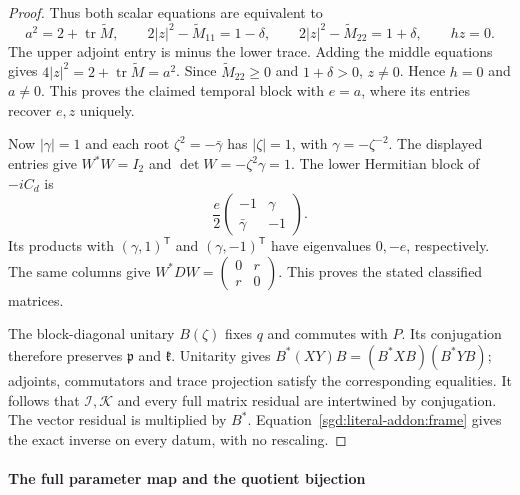 \begin{proof}
Thus both scalar equations are equivalent to
\[
 a^2=2+\operatorname{tr}\widetilde M,\qquad
 2|z|^2-\widetilde M_{11}=1-\delta,\qquad
 2|z|^2-\widetilde M_{22}=1+\delta,\qquad hz=0.
\]
The upper adjoint entry is minus the lower trace.
Adding the middle equations gives
$4|z|^2=2+\operatorname{tr}\widetilde M=a^2$.
Since $\widetilde M_{22}\ge0$ and $1+\delta>0$, $z\ne0$.
Hence $h=0$ and $a\ne0$. This proves the claimed temporal block
with $e=a$, where its entries recover $e,z$ uniquely.

Now $|\gamma|=1$ and each root $\zeta^2=-\bar\gamma$ has
$|\zeta|=1$, with $\gamma=-\zeta^{-2}$. The displayed entries give
$W^*W=I_2$ and $\det W=-\zeta^2\gamma=1$.
The lower Hermitian block of $-iC_d$ is
\[
 \frac e2\begin{pmatrix}-1&\gamma\\\bar\gamma&-1\end{pmatrix}.
\]
Its products with $(\gamma,1)^{\mathsf T}$ and
$(\gamma,-1)^{\mathsf T}$ have eigenvalues $0,-e$,
respectively. The same columns give
$W^*DW=\left(\begin{smallmatrix}0&r\\r&0\end{smallmatrix}\right)$.
This proves the stated classified matrices.

The block-diagonal unitary $B(\zeta)$ fixes $q$ and commutes with
$P$. Its conjugation therefore preserves $\mathfrak p$ and
$\mathfrak k$. Unitarity gives
$B^*(XY)B=(B^*XB)(B^*YB)$; adjoints, commutators and trace
projection satisfy the corresponding equalities.
It follows that $\mathcal I,\mathcal K$ and every full matrix
residual are intertwined by conjugation. The vector residual is
multiplied by $B^*$. Equation~\eqref{sgd:literal-addon:frame} gives
the exact inverse on every datum, with no rescaling.
\end{proof}

\paragraph{The full parameter map and the quotient bijection}

